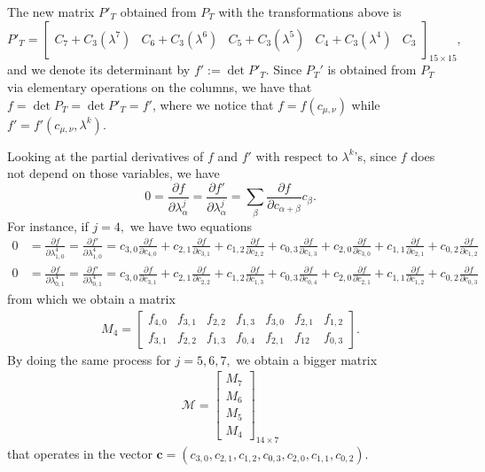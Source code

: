\documentclass[letterpaper,11pt]{amsart}
\theoremstyle{plain}
\theoremstyle{definition}
\begin{document}
The new matrix $P'_T$ obtained from $P_T$ with the transformations above is
$$
P'_T=\begin{bmatrix}
C_7+C_3(\lambda^7)&C_6+C_3(\lambda^6)& C_5+C_3(\lambda^5) & C_4+C_3(\lambda^4) & C_3    
\end{bmatrix}_{15 \times 15},
$$
and we denote its determinant by $f':=\det P'_T$. Since $P_T'$ is obtained from $P_T$ via elementary operations on the columns, we have that $f=\det P_T=\det P'_T=f'$, where we notice that $f=f(c_{\mu,\nu})$ while $f'=f'(c_{\mu,\nu},\lambda^k)$. 

Looking at the partial derivatives of $f$ and $f'$ with respect to $\lambda^k$'s, since $f$ does not depend on those variables, we have
$$
0=\frac{\partial f}{\partial \lambda^j_{\alpha}}=\frac{\partial f'}{\partial \lambda^j_{\alpha}}=\sum_{\beta}\frac{\partial f}{\partial c_{\alpha+\beta}}c_{\beta}.
$$ 
For instance, if $j=4,$ we have two equations \begin{align*}
0&=\frac{\partial f}{\partial \lambda_{1,0}^4}=\frac{\partial f'}{\partial \lambda_{1,0}^4}=c_{3,0}\frac{\partial f}{\partial c_{4,0}}+c_{2,1}\frac{\partial f}{\partial c_{3,1}}+c_{1,2}\frac{\partial f}{\partial c_{2,2}}+c_{0,3}\frac{\partial f}{\partial c_{1,3}}+c_{2,0}\frac{\partial f}{\partial c_{3,0}}+c_{1,1}\frac{\partial f}{\partial c_{2,1}}+c_{0,2}\frac{\partial f}{\partial c_{1,2}} \\ 0&=\frac{\partial f}{\partial \lambda_{0,1}^4}=\frac{\partial f'}{\partial \lambda_{0,1}^4}=c_{3,0}\frac{\partial f}{\partial c_{3,1}}+c_{2,1}\frac{\partial f}{\partial c_{2,2}}+c_{1,2}\frac{\partial f}{\partial c_{1,3}}+c_{0,3}\frac{\partial f}{\partial c_{0,4}}+c_{2,0}\frac{\partial f}{\partial c_{2,1}}+c_{1,1}\frac{\partial f}{\partial c_{1,2}}+c_{0,2}\frac{\partial f}{\partial c_{0,3}}   
\end{align*} from which we obtain a matrix \begin{align}
M_4=\begin{bmatrix} \label{eq: eqs}
f_{4,0} & f_{3,1} & f_{2,2} & f_{1,3} & f_{3,0} & f_{2,1} & f_{1,2} \\
f_{3,1} & f_{2,2} & f_{1,3} & f_{0,4} & f_{2,1} & f_{12} & f_{0,3}
\end{bmatrix}.    
\end{align} By doing the same process for $j=5,6,7,$ we obtain a bigger matrix \begin{align*}
\mathcal{M}=\begin{bmatrix}
M_7 \\
M_6 \\
M_5 \\
M_4
\end{bmatrix}_{14 \times 7}   
\end{align*} that operates in the vector $\bm{c}=(c_{3,0},c_{2,1},c_{1,2},c_{0,3},c_{2,0},c_{1,1},c_{0,2}).$ 
\end{document}
